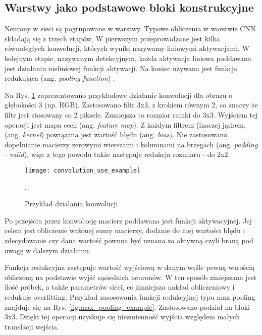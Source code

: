 \subsection{Warstwy jako podstawowe bloki konstrukcyjne}

Neurony w sieci są pogrupowane w warstwy. Typowe obliczenia w warstwie CNN składają się z trzech etapów. W pierwszym przeprowadzane jest kilka równoległych konwolucji, których wyniki nazywamy liniowymi aktywacjami. W kolejnym etapie, nazywanym detekcyjnym, każda aktywacja liniowa poddawana jest działaniu nieliniowej funkcji aktywacji. Na koniec używana jest funkcja redukująca (ang. \textit{pooling function}) \cite{deep_learning}.

{\parindent0pt %
Na Rys. \ref{fig:convolution_example} zaprezentowano przykładowe działanie konwolucji dla obrazu o głębokości 3 (np. RGB). Zastosowano filtr 3x3, z krokiem równym 2, co znaczy że filtr jest stosowany co 2 piksele. Zmniejsza to rozmiar ramki do 3x3. Wyjściem tej operacji jest mapa cech (ang. \textit{feature map}). Z każdym filtrem (inaczej jądrem, (ang. \textit{kernel}) powiązana jest wartość błędu (ang. \textit{bias)}. Nie zastosowano dopełnianie macierzy zerowymi wierszami i kolumnami na brzegach (ang. \textit{padding - valid}), więc z tego powodu także następuje redukcja rozmiaru - do 2x2. 

\begin{figure}[h!]
	\centering
	\centering
		\texttt{[image: convolution\_use\_example]}	
	\caption{Przykład działania konwolucji}.
	\label{fig:convolution_example}
\end{figure}

Po przejściu przez konwolucję macierz poddawana jest funkcji aktywacyjnej. Jej celem jest obliczenie ważonej sumy macierzy, dodanie do niej wartości błędu i zdecydowanie czy dana wartość pownna być uznana za aktywną czyli braną pod uwagę w dalszym działaniu.

Funkcja redukcyjna zastępuje wartość wyjściową w danym węźle pewną warością obliczoną na podstawie wyjść sąsiednich neuronów. W ten sposób zmiejszana jest ilość próbek, a także parametrów sieci, co zmniejsza nakład obliczeniowy i redukuje overfitting. Przykład zasosowania funkcji redukcyjnej typu max pooling znajduje się na Rys. \ref{fig:max_pooling_example}. Zastosowano podział na bloki 3x3. Dzięki tej operacji uzyskuje się niezmienność wyjścia względem małych translacji wejścia.

}
